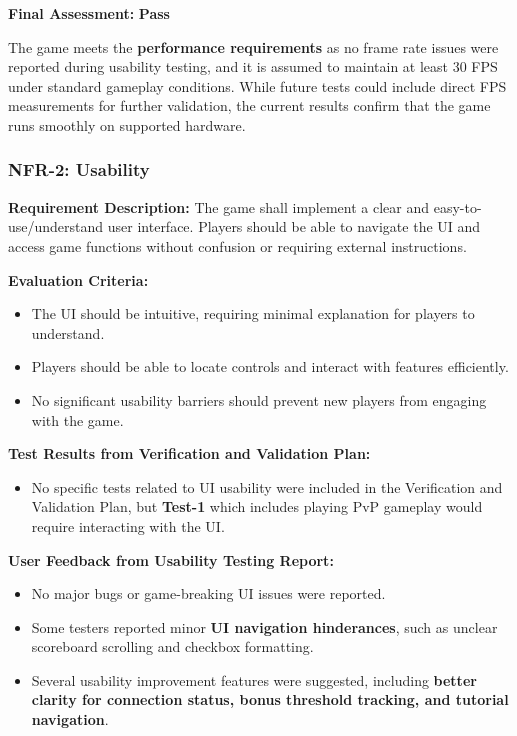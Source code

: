 \documentclass[12pt, titlepage]{article}
\begin{document}
\textbf{Final Assessment:} \textbf{Pass}  

The game meets the \textbf{performance requirements} as no frame rate issues were reported during usability testing, and it is assumed to maintain at least 30 FPS under standard gameplay conditions. While future tests could include direct FPS measurements for further validation, the current results confirm that the game runs smoothly on supported hardware.


\subsubsection{NFR-2: Usability}
\label{NFR2}

\textbf{Requirement Description:}  
The game shall implement a clear and easy-to-use/understand user interface. Players should be able to navigate the UI and access game functions without confusion or requiring external instructions.

\textbf{Evaluation Criteria:}  
\begin{itemize}
    \item The UI should be intuitive, requiring minimal explanation for players to understand.
    \item Players should be able to locate controls and interact with features efficiently.
    \item No significant usability barriers should prevent new players from engaging with the game.
\end{itemize}

\textbf{Test Results from Verification and Validation Plan:}  
\begin{itemize}
    \item No specific tests related to UI usability were included in the Verification and Validation Plan, but \textbf{Test-1} which includes playing PvP gameplay would require interacting with the UI.
\end{itemize}

\textbf{User Feedback from Usability Testing Report:}  
\begin{itemize}
    \item No major bugs or game-breaking UI issues were reported.
    \item Some testers reported minor \textbf{UI navigation hinderances}, such as unclear scoreboard scrolling and checkbox formatting.
    \item Several usability improvement features were suggested, including \textbf{better clarity for connection status, bonus threshold tracking, and tutorial navigation}.
\end{itemize}
\end{document}
